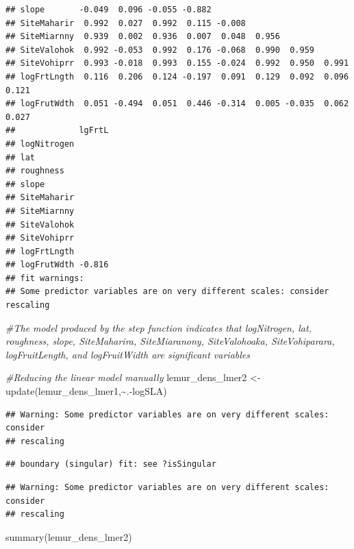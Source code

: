 \documentclass[
  12pt,
]{article}
\newenvironment{Shaded}{\begin{snugshade}}{\end{snugshade}}
\newcommand{\CommentTok}[1]{\textcolor[rgb]{0.56,0.35,0.01}{\textit{#1}}}
\newcommand{\FunctionTok}[1]{\textcolor[rgb]{0.00,0.00,0.00}{#1}}
\newcommand{\NormalTok}[1]{#1}
\newcommand{\OtherTok}[1]{\textcolor[rgb]{0.56,0.35,0.01}{#1}}
\newcommand{\SpecialCharTok}[1]{\textcolor[rgb]{0.00,0.00,0.00}{#1}}
\begin{document}
\begin{verbatim}
## slope       -0.049  0.096 -0.055 -0.882                                   
## SiteMaharir  0.992  0.027  0.992  0.115 -0.008                            
## SiteMiarnny  0.939  0.002  0.936  0.007  0.048  0.956                     
## SiteValohok  0.992 -0.053  0.992  0.176 -0.068  0.990  0.959              
## SiteVohiprr  0.993 -0.018  0.993  0.155 -0.024  0.992  0.950  0.991       
## logFrtLngth  0.116  0.206  0.124 -0.197  0.091  0.129  0.092  0.096  0.121
## logFrutWdth  0.051 -0.494  0.051  0.446 -0.314  0.005 -0.035  0.062  0.027
##             lgFrtL
## logNitrogen       
## lat               
## roughness         
## slope             
## SiteMaharir       
## SiteMiarnny       
## SiteValohok       
## SiteVohiprr       
## logFrtLngth       
## logFrutWdth -0.816
## fit warnings:
## Some predictor variables are on very different scales: consider rescaling
\end{verbatim}

\begin{Shaded}
\begin{Highlighting}[]
\CommentTok{\#The model produced by the step function indicates that logNitrogen, lat, roughness, slope, SiteMaharira, SiteMiaranony, SiteValohoaka, SiteVohiparara, logFruitLength, and logFruitWidth are significant variables}

\CommentTok{\#Reducing the linear model manually}
\NormalTok{lemur\_dens\_lmer2 }\OtherTok{\textless{}{-}} \FunctionTok{update}\NormalTok{(lemur\_dens\_lmer1,}\SpecialCharTok{\textasciitilde{}}\NormalTok{.}\SpecialCharTok{{-}}\NormalTok{logSLA)}
\end{Highlighting}
\end{Shaded}

\begin{verbatim}
## Warning: Some predictor variables are on very different scales: consider
## rescaling
\end{verbatim}

\begin{verbatim}
## boundary (singular) fit: see ?isSingular
\end{verbatim}

\begin{verbatim}
## Warning: Some predictor variables are on very different scales: consider
## rescaling
\end{verbatim}

\begin{Shaded}
\begin{Highlighting}[]
\FunctionTok{summary}\NormalTok{(lemur\_dens\_lmer2)}
\end{Highlighting}
\end{Shaded}
\end{document}
